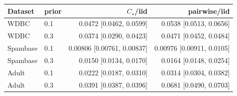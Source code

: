 \begin{tabular}{llrr}
\toprule
Dataset & prior & $C_\star$/iid & pairwise/iid \\
\midrule
WDBC & 0.1 & 0.0472 [0.0462, 0.0599] & 0.0538 [0.0513, 0.0656] \\
WDBC & 0.3 & 0.0374 [0.0290, 0.0423] & 0.0471 [0.0452, 0.0484] \\
Spambase & 0.1 & 0.00806 [0.00761, 0.00837] & 0.00976 [0.00911, 0.0105] \\
Spambase & 0.3 & 0.0150 [0.0134, 0.0170] & 0.0164 [0.0148, 0.0254] \\
Adult & 0.1 & 0.0222 [0.0187, 0.0310] & 0.0314 [0.0304, 0.0382] \\
Adult & 0.3 & 0.0391 [0.0387, 0.0396] & 0.0681 [0.0490, 0.0703] \\
\bottomrule
\end{tabular}
